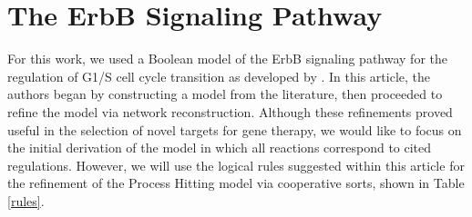 \documentclass{article}
\begin{document}
\appendix
\section{The ErbB Signaling Pathway}
For this work, we used a Boolean model of the ErbB signaling pathway for the regulation of G1/S cell cycle transition as developed by \cite{Sahin09}. In this article, the authors began by constructing a model from the literature, then proceeded to refine the model via network reconstruction. Although these refinements proved useful in the selection of novel targets for gene therapy, we would like to focus on the initial derivation of the model in which all reactions correspond to cited regulations. However, we will use the logical rules suggested within this article for the refinement of the Process Hitting model via cooperative sorts, shown in Table \ref{rules}.\\
\end{document}
